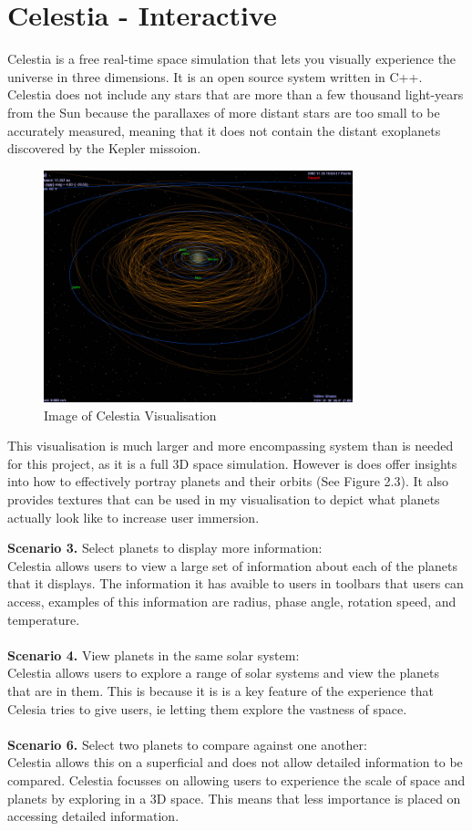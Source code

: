 \section{Celestia - Interactive}
Celestia \cite{celestia} is a free real-time space simulation that lets you
visually experience the universe in three dimensions. It is an open source
system written in C++. Celestia does not include any stars that are more than a
few thousand light-years from the Sun because the parallaxes of more distant
stars are too small to be accurately measured, meaning that it does not contain
the distant exoplanets discovered by the Kepler missoion. 
\begin{figure}[H]
  \centering
      \includegraphics[width=0.8\textwidth]{images/celestia.jpg}
  \caption{Image of Celestia Visualisation}
\end{figure}
This visualisation is much larger and more encompassing system than is needed
for this project, as it is a full 3D space simulation. However is does offer
insights into how to effectively portray planets and their orbits (See Figure
2.3). It also provides textures that can be used in my visualisation to depict
what planets actually look like to increase user immersion.

{\bf Scenario 3.} Select planets to display more information:\\
Celestia allows users to view a large set of information about each of the
planets that it displays. The information it has avaible to users in toolbars
that users can access, examples of this information are radius, phase angle,
rotation speed, and temperature.  
\\\\
{\bf Scenario 4.} View planets in the same solar system:\\
Celestia allows users to explore a range of solar systems and view the planets
that are in them. This is because it is is a key feature of the experience that
Celesia tries to give users, ie letting them explore the vastness of space. 
\\\\
{\bf Scenario 6.} Select two planets to compare against one another:\\
Celestia allows this on a superficial and does not allow detailed information to
be compared. Celestia focusses on allowing users to experience the scale of
space and planets by exploring in a 3D space. This means that less importance is
placed on accessing detailed information.


